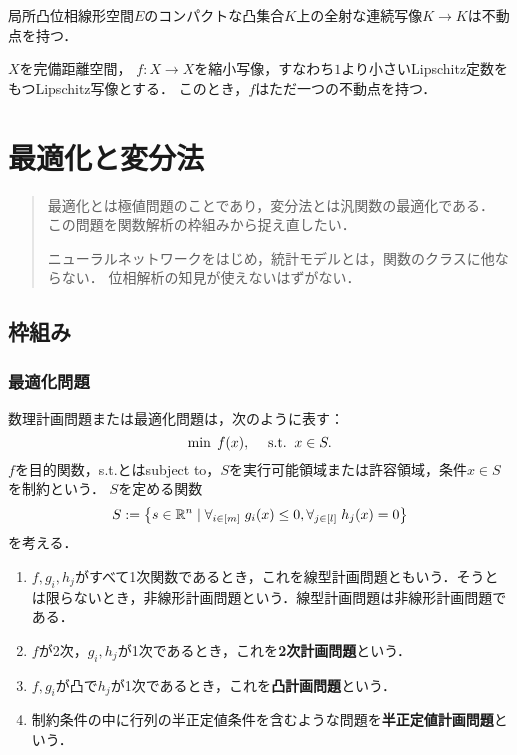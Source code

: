 \documentclass[uplatex,dvipdfmx]{jsreport}
\begin{document}
\begin{theorem}
    局所凸位相線形空間$E$のコンパクトな凸集合$K$上の全射な連続写像$K\to K$は不動点を持つ．
\end{theorem}

\begin{theorem}[Banach (22)]
    $X$を完備距離空間，
    $f:X\to X$を縮小写像，すなわち$1$より小さいLipschitz定数をもつLipschitz写像とする．
    このとき，$f$はただ一つの不動点を持つ．
\end{theorem}

\chapter{最適化と変分法}

\begin{quotation}
    最適化とは極値問題のことであり，変分法とは汎関数の最適化である．
    この問題を関数解析の枠組みから捉え直したい．

    ニューラルネットワークをはじめ，統計モデルとは，関数のクラスに他ならない．
    位相解析の知見が使えないはずがない．
\end{quotation}

\section{枠組み}

\subsection{最適化問題}

\begin{definition}
    数理計画問題または最適化問題は，次のように表す：
    \[\min\;f(x),\quad\;\mathrm{s.t.}\;\;x\in S.\]
    $f$を目的関数，s.t.とはsubject to，$S$を実行可能領域または許容領域，条件$x\in S$を制約という．
    $S$を定める関数
    \[S:=\left\{s\in\mathbb{R}^n\mid\forall_{i\in[m]}\;g_i(x)\le0,\forall_{j\in[l]}\;h_j(x)=0\right\}\]
    を考える．
    \begin{enumerate}
        \item $f,g_i,h_j$がすべて1次関数であるとき，これを線型計画問題ともいう．そうとは限らないとき，非線形計画問題という．線型計画問題は非線形計画問題である．
        \item $f$が2次，$g_i,h_j$が1次であるとき，これを\textbf{2次計画問題}という．
        \item $f,g_i$が凸で$h_j$が1次であるとき，これを\textbf{凸計画問題}という．
        \item 制約条件の中に行列の半正定値条件を含むような問題を\textbf{半正定値計画問題}という．
    \end{enumerate}
\end{definition}
\end{document}
